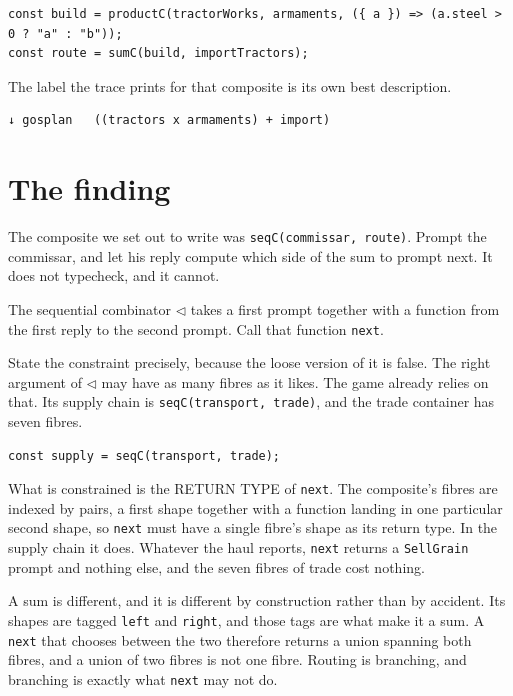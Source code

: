 \documentclass[11pt,a4paper]{article}
\begin{document}
\begin{lstlisting}[language=TS]
const build = productC(tractorWorks, armaments, ({ a }) => (a.steel > 0 ? "a" : "b"));
const route = sumC(build, importTractors);
\end{lstlisting}

The label the trace prints for that composite is its own best description.

\begin{lstlisting}[language=SH]
  ↓ gosplan   ((tractors x armaments) + import)
\end{lstlisting}

\section{The finding}

\begin{alarmbox}
The composite we set out to write was \texttt{seqC(commissar, route)}. Prompt the commissar,
and let his reply compute which side of the sum to prompt next. It does not typecheck, and it
cannot.
\end{alarmbox}

The sequential combinator $\lhd$ takes a first prompt together with a function from the first
reply to the second prompt. Call that function \texttt{next}.

State the constraint precisely, because the loose version of it is false. The right argument of
$\lhd$ may have as many fibres as it likes. The game already relies on that. Its supply chain
is \texttt{seqC(transport, trade)}, and the trade container has seven fibres.

\begin{lstlisting}[language=TS]
const supply = seqC(transport, trade);
\end{lstlisting}

What is constrained is the RETURN TYPE of \texttt{next}. The composite's fibres are indexed by
pairs, a first shape together with a function landing in one particular second shape, so
\texttt{next} must have a single fibre's shape as its return type. In the supply chain it does.
Whatever the haul reports, \texttt{next} returns a \texttt{SellGrain} prompt and nothing else,
and the seven fibres of trade cost nothing.

A sum is different, and it is different by construction rather than by accident. Its shapes are
tagged \texttt{left} and \texttt{right}, and those tags are what make it a sum. A \texttt{next}
that chooses between the two therefore returns a union spanning both fibres, and a union of two
fibres is not one fibre. Routing is branching, and branching is exactly what \texttt{next} may
not do.
\end{document}
